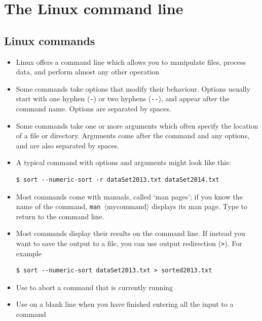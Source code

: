 \documentclass[a4paper,twoside]{memoir}
\newcommand{\shellcmd}{\texttt}
\newcommand{\shellvar}[1]{$\langle \text{#1}\rangle$}
\begin{document}
\tableofcontents*

\chapter{The Linux command line}
\label{chap:linux}

\section{Linux commands}

\begin{itemize}
\item Linux offers a command line which allows you to manipulate files, process data, and perform almost any other operation
\item Some commands take options that modify their behaviour.  Options usually start with one hyphen (\shellcmd{-}) or two hyphens (\shellcmd{-{}-}), and appear after the command name.  Options are separated by spaces.
\item Some commands take one or more arguments which often specify the location of a file or directory.  Arguments come after the command and any options, and are also separated by spaces.
\item A typical command with options and arguments might look like this:
\begin{verbatim}
$ sort --numeric-sort -r dataSet2013.txt dataSet2014.txt
\end{verbatim}
\item Most commands come with manuals, called `man pages'; if you know the name of the command, \shellcmd{man \shellvar{mycommand}} displays its man page.  Type  to return to the command line.
\item Most commands display their results on the command line.  If instead you want to save the output to a file, you can use output redirection (\shellcmd{>}).  For example
\begin{verbatim}
$ sort --numeric-sort dataSet2013.txt > sorted2013.txt
\end{verbatim}
\item Use  to abort a command that is currently running
\item Use  on a blank line when you have finished entering all the input to a command
\end{itemize}
\end{document}
